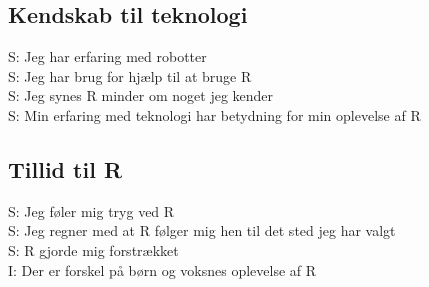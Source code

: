 \subsection{Kendskab til teknologi}
%
S: Jeg har erfaring med robotter\\
S: Jeg har brug for hjælp til at bruge R\\
S: Jeg synes R minder om noget jeg kender\\
S: Min erfaring med teknologi har betydning for min oplevelse af R

\subsection{Tillid til R}
%
S: Jeg føler mig tryg ved R\\
S: Jeg regner med at R følger mig hen til det sted jeg har valgt\\
S: R gjorde mig forstrækket\\
I: Der er forskel på børn og voksnes oplevelse af R







